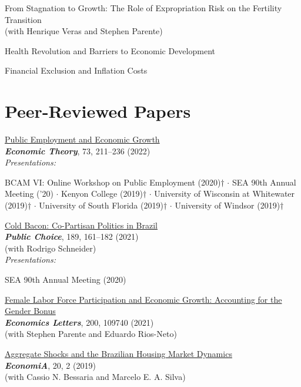\documentclass[mm, 10pt]{simple_style}
\begin{document}
\begin{resume}
From Stagnation to Growth: The Role of Expropriation Risk on the Fertility Transition\\
(with Henrique Veras and Stephen Parente)

Health Revolution and Barriers to Economic Development

Financial Exclusion and Inflation Costs


\section{Peer-Reviewed Papers}
\href{https://doi.org/10.1007/s00199-020-01333-6}{Public Employment and Economic Growth}\\
\textbf{\textit{Economic Theory}}, 73, 211–236 (2022)  \\
\textit{Presentations:} 
\begin{minipage}[t]{0.7\textwidth}
        BCAM VI: Online Workshop on Public Employment (2020)$\dagger$ $\cdot$ SEA 90th Annual Meeting ('20) $\cdot$
        Kenyon College (2019)$\dagger$ $\cdot$ 
        University of Wisconsin at Whitewater (2019)$\dagger$ $\cdot$ 
        University of South Florida  (2019)$\dagger$ $\cdot$ 
        University of Windsor  (2019)$\dagger$
\end{minipage}

\href{https://doi.org/10.1007/s11127-020-00869-4}{Cold Bacon: Co-Partisan Politics in Brazil} \\
\textbf{\textit{Public Choice}}, 189, 161–182 (2021) \\
(with Rodrigo Schneider) \\
\textit{Presentations:} 
\begin{minipage}[t]{0.7\textwidth}
        SEA 90th Annual Meeting (2020) 
\end{minipage}

\clearpage 
\href{https://doi.org/10.1016/j.econlet.2021.109740}{Female Labor Force Participation and Economic Growth: Accounting for the Gender Bonus}  \\
 \textbf{\textit{Economics Letters}}, 200, 109740 (2021)  \\ 
(with Stephen Parente and Eduardo Rios-Neto)

\href{https://doi.org/10.1016/j.econ.2019.08.001}{Aggregate Shocks and the Brazilian Housing Market Dynamics} \\
\textbf{\textit{EconomiA}}, 20, 2 (2019) \\
(with Cassio N. Bessaria and Marcelo E. A. Silva)


\end{resume}
\end{document}
